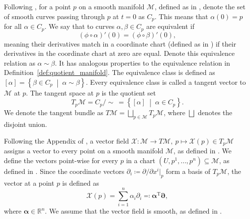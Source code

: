 \begin{definition}\label{def:tangent_space}
    Following \cite[Def.~8.33]{Boumal2023}, for a point $p$ on a smooth manifold $\mathcal{M}$, defined as in \cite[p.~13]{Lee2012:1}, denote the set of smooth curves \cite[Def.~8.5]{Boumal2023} passing through $p$ at $t=0$ as $C_{p}$. This means that $\alpha(0)=p$ for all $\alpha\in C_{p}$. We say that to curves $\alpha, \beta\in C_{p}$ are equivalent if 
    \begin{equation*}
        (\phi\circ \alpha)'(0)=(\phi\circ \beta)'(0),
    \end{equation*}
    meaning their derivatives match in a \textup{coordinate chart} (defined as in \cite[p.~4]{Lee2012:1}) if their derivatives in the coordinate chart at zero are equal. Denote this equivalence relation as $\alpha\sim \beta$. It has analogous properties to the equivalence relation in Definition~\ref{def:quotient_manifold}. The equivalence class is defined as $[\alpha]=\left\{\beta\in C_{p} \;\middle|\; \alpha\sim \beta\right\}$. Every equivalence class is called a \textup{tangent vector} to $\mathcal{M}$ at $p$. The \textup{tangent space} at $p$ is the quotient set
    \begin{equation*}
        T_{p}\mathcal{M}=C_{p}/\sim~=\left\{[\alpha] \;\middle|\; \alpha\in C_{p}\right\}.
    \end{equation*}  
    We denote the \textup{tangent bundle} as $T\mathcal{M}=\bigsqcup_{p\in \mathcal{M}}T_{p}\mathcal{M}$, where $\bigsqcup$ denotes the disjoint union.
\end{definition}

\begin{definition}\label{def:vector_field_on_manifold}
    Following the Appendix of \cite[A.3]{Tu2017}, a vector field $\mathcal{X}\colon \mathcal{M}\xrightarrow{}T \mathcal{M},~p\mapsto \mathcal{X}(p)\in T_{p}\mathcal{M}$ assigns a vector to every point on a smooth manifold $\mathcal{M}$, as defined in \cite[p.~13]{Lee2012:1}. We define the vectors point-wise for every $p$ in a chart $(U,p^{1},\dots,p^{n})\subseteq\mathcal{M}$, as defined in \cite[A.1]{Tu2017}. Since the coordinate vectors $\partial_{i}\coloneqq \partial/\partial x^i|_{p}$ form a basis of $T_{p}\mathcal{M}$, the vector at a point $p$ is defined as
    \begin{equation*}
        \mathcal{X}(p)=\sum\limits_{i=1}^{n}\alpha_{i}\partial_{i}\eqqcolon \boldsymbol{\alpha}^{\mathrm{T}}\boldsymbol{\partial},
    \end{equation*}
    where $\boldsymbol{\alpha}\in \mathbb{R}^{n}$. We assume that the vector field is smooth, as defined in \cite[A.3]{Tu2017}. 
\end{definition}

